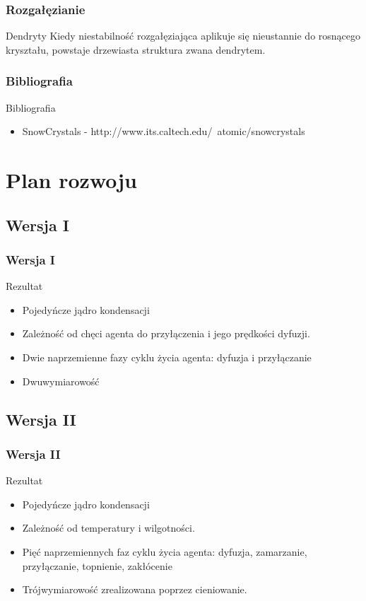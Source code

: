 \documentclass[]{beamer}
\begin{document}
\begin{frame}
	\frametitle{Rozgałęzianie}
	\begin{block}{Dendryty}
		Kiedy niestabilność rozgałęziająca aplikuje się nieustannie do rosnącego kryształu, powstaje drzewiasta struktura zwana dendrytem.	
	\end{block}
\end{frame}

\begin{frame}
	\frametitle{Bibliografia}
	\begin{block}{Bibliografia}
		\begin{itemize}
	 		\item SnowCrystals - http://www.its.caltech.edu/~atomic/snowcrystals
		\end{itemize}
	\end{block}
\end{frame}

\section{Plan rozwoju}

\subsection{Wersja I}

\begin{frame}
	\frametitle{Wersja I}
	\begin{block}{Rezultat}
		\begin{itemize}
	 		\item Pojedyńcze jądro kondensacji
			\item Zależność od chęci agenta do przyłączenia i jego prędkości dyfuzji.
			\item Dwie naprzemienne fazy cyklu życia agenta: dyfuzja i przyłączanie 
			\item Dwuwymiarowość
		\end{itemize}
	\end{block}
\end{frame}


\subsection{Wersja II}

\begin{frame}
	\frametitle{Wersja II}
	\begin{block}{Rezultat}
		\begin{itemize}
	 		\item Pojedyńcze jądro kondensacji
			\item Zależność od temperatury i wilgotności.
			\item Pięć naprzemiennych faz cyklu życia agenta: dyfuzja, zamarzanie, przyłączanie, topnienie, zakłócenie 
			\item Trójwymiarowość zrealizowana poprzez cieniowanie.
		\end{itemize}
	\end{block}
\end{frame}
\end{document}
